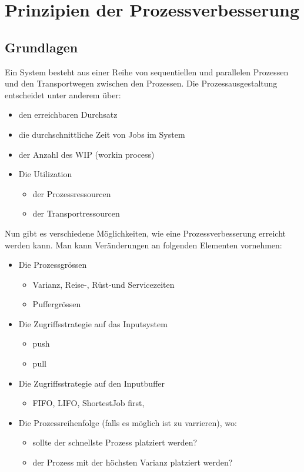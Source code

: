 \section{Prinzipien der Prozessverbesserung}
\subsection{Grundlagen}
Ein System besteht aus einer Reihe von sequentiellen und parallelen Prozessen und den Transportwegen zwischen den Prozessen. Die Prozessausgestaltung entscheidet unter anderem über:
\begin{itemize}
    \item den erreichbaren Durchsatz
    \item die durchschnittliche Zeit von Jobs im System
    \item der Anzahl des WIP (workin process)
    \item Die Utilization
    \begin{itemize}
        \item der Prozessressourcen
        \item der Transportressourcen
    \end{itemize}
\end{itemize}

Nun gibt es verschiedene Möglichkeiten, wie eine Prozessverbesserung erreicht werden kann.
Man kann Veränderungen an folgenden Elementen vornehmen:
\begin{itemize}
    \item Die Prozessgrössen 
    \begin{itemize}
        \item Varianz, Reise-, Rüst-und Servicezeiten
        \item Puffergrössen
    \end{itemize}
    \item Die Zugriffsstrategie auf das Inputsystem 
    \begin{itemize}
        \item push
        \item pull
    \end{itemize}
    \item Die Zugriffsstrategie auf den Inputbuffer
    \begin{itemize}
        \item FIFO, LIFO, ShortestJob first,
    \end{itemize}
    \item Die Prozessreihenfolge (falls es möglich ist zu varrieren), wo:
    \begin{itemize}
        \item sollte der schnellste Prozess platziert werden?
        \item der Prozess mit der höchsten Varianz platziert werden?
    \end{itemize}
\end{itemize}


